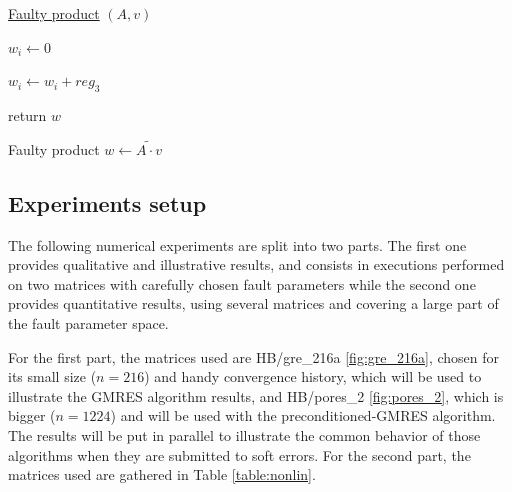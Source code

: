 \begin{algorithm}
    
    \underline{Faulty product} $(A, v)$\;
      {
      $w_i \leftarrow 0$ \;
      {
        { 
            
            
 			$w_i \leftarrow w_i + reg_3$ \;
        }

      }
      }
      return $w$\;
    \caption{Faulty product $w \leftarrow \widetilde{A \cdot v}$}\label{alg:faulty_product}
\end{algorithm}


\subsection{Experiments setup}
The following numerical experiments are split into two parts. The first one provides qualitative and illustrative results, and consists in executions performed on two matrices with carefully chosen fault parameters while the second one provides quantitative results, using several matrices and covering a large part of the fault parameter space. 


For the first part, the matrices used are HB/gre_216a \ref{fig:gre_216a}, chosen for its small size ($n=216$) and handy convergence history, which will be used to illustrate the GMRES algorithm results, and HB/pores_2 \ref{fig:pores_2}, which is bigger ($n=1224$) and will be used with the preconditioned-GMRES algorithm. The results will be put in parallel to illustrate the common behavior of those algorithms when they are submitted to soft errors. For the second part, the matrices used are gathered in Table \ref{table:nonlin}.

